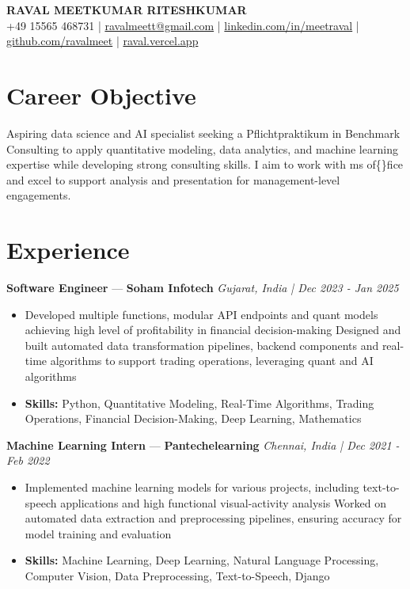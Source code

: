\documentclass[a4paper,10pt]{article}
\begin{document}
\begin{center}
  {\Large\bfseries RAVAL MEETKUMAR RITESHKUMAR}\\[2pt]
  {\small +49 15565 468731 \;|\; \href{mailto:ravalmeett@gmail.com}{ravalmeett@gmail.com} \;|\; \href{https://www.linkedin.com/in/meetraval/}{linkedin.com/in/meetraval} \;|\; \href{https://github.com/ravalmeet}{github.com/ravalmeet} \;|\; \href{https://raval.vercel.app/}{raval.vercel.app}}
\end{center}
\vspace{-3pt}

\section*{Career Objective}
Aspiring data science and AI specialist seeking a Pflichtpraktikum in Benchmark Consulting to apply quantitative modeling, data analytics, and machine learning expertise while developing strong consulting skills. I aim to work with ms of\{\}fice and excel to support analysis and presentation for management-level engagements.\par

\section*{Experience}
\textbf{Software Engineer} — \textbf{Soham Infotech} \hfill \textit{Gujarat, India \;|\; Dec 2023 - Jan 2025}\par
\vspace{1pt}
\begin{itemize}
  \item Developed multiple functions, modular API endpoints and quant models achieving high level of profitability in financial decision-making Designed and built automated data transformation pipelines, backend components and real-time algorithms to support trading operations, leveraging quant and AI algorithms
  \item \textbf{Skills:} Python, Quantitative Modeling, Real-Time Algorithms, Trading Operations, Financial Decision-Making, Deep Learning, Mathematics
\end{itemize}
\vspace{3pt}
\textbf{Machine Learning Intern} — \textbf{Pantechelearning} \hfill \textit{Chennai, India \;|\; Dec 2021 - Feb 2022}\par
\vspace{1pt}
\begin{itemize}
  \item Implemented machine learning models for various projects, including text-to-speech applications and high functional visual-activity analysis Worked on automated data extraction and preprocessing pipelines, ensuring accuracy for model training and evaluation
  \item \textbf{Skills:} Machine Learning, Deep Learning, Natural Language Processing, Computer Vision, Data Preprocessing, Text-to-Speech, Django
\end{itemize}
\end{document}

